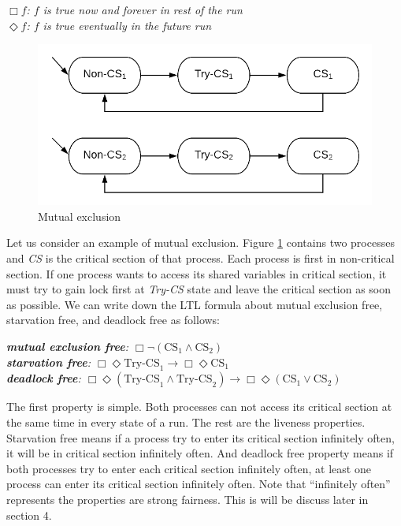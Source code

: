 {\medbreak\indent\textit{$\Box f$: $f$ is true now and forever in rest of the run}}
{\\\indent\textit{$\Diamond f$: $f$ is true eventually in the future run}}
\medbreak

\begin{figure}
\includegraphics[width=0.7\linewidth]{img/mutex}
\caption{Mutual exclusion}
\label{fig:mutex}
\end{figure}

Let us consider an example of mutual exclusion. Figure \ref{fig:mutex} contains two processes and \textit{CS} is the critical section of that process. Each process is first in non-critical section. If one process wants to access its shared variables in critical section, it must try to gain lock first at \textit{Try-CS} state and leave the critical section as soon as possible. We can write down the LTL formula about mutual exclusion free, starvation free, and deadlock free as follows:

{\medbreak\indent\textit{\textbf{mutual exclusion free}: $\Box\neg(\text{CS}_1\wedge\text{CS}_2)$}}
{\\\indent\textit{\textbf{starvation free}: $\Box\Diamond \text{Try-CS}_1\rightarrow\Box\Diamond\text{CS}_1$}}
{\\\indent\textit{\textbf{deadlock free}: $\Box\Diamond(\text{Try-CS}_1\wedge\text{Try-CS}_2)\rightarrow\Box\Diamond(\text{CS}_1\vee\text{CS}_2)$}}
\medbreak

The first property is simple. Both processes can not access its critical section at the same time in every state of a run. The rest are the liveness properties. Starvation free means if a process try to enter its critical section infinitely often, it will be in critical section infinitely often. And deadlock free property means if both processes try to enter each critical section infinitely often, at least one process can enter its critical section infinitely often. Note that ``infinitely often'' represents the properties are strong fairness. This is will be discuss later in section 4.



